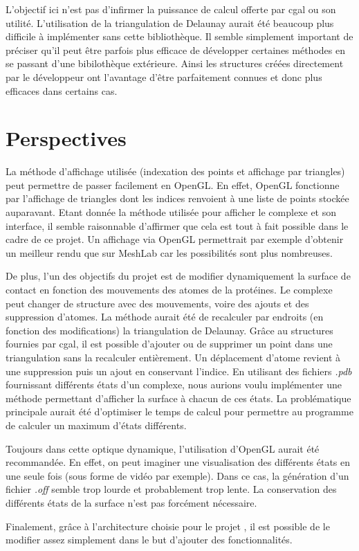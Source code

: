 L'objectif ici n'est pas d'infirmer la puissance de calcul offerte par \gls{cgal} ou son utilité.
L'utilisation de la triangulation de Delaunay aurait été beaucoup plus difficile
à implémenter sans cette bibliothèque. Il semble simplement important de préciser qu'il peut être
parfois plus efficace de développer certaines méthodes en se passant d'une bibilothèque extérieure.
Ainsi les structures créées directement par le développeur ont l'avantage d'être
parfaitement connues et donc plus efficaces dans certains cas.

\section{Perspectives}

La méthode d'affichage utilisée (indexation des points et affichage par triangles)
peut permettre de passer facilement en OpenGL. En effet, OpenGL fonctionne par l'affichage
de triangles dont les indices renvoient à une liste de points stockée auparavant.
Etant donnée la méthode utilisée pour afficher le complexe et son interface, il semble
raisonnable d'affirmer que cela est tout à fait possible dans le cadre de ce projet.
Un affichage via OpenGL permettrait par exemple d'obtenir un meilleur rendu que sur
MeshLab car les possibilités sont plus nombreuses.

De plus, l'un des objectifs du projet est de modifier dynamiquement la surface de contact
en fonction des mouvements des atomes de la protéines. Le complexe peut changer de structure
avec des mouvements, voire des ajouts et des suppression d'atomes. La méthode aurait été
de recalculer par endroits (en fonction des modifications) la triangulation de Delaunay.
Grâce au structures fournies par \gls{cgal}, il est possible d'ajouter ou de supprimer
un point dans une triangulation sans la recalculer entièrement. Un déplacement d'atome
revient à une suppression puis un ajout en conservant l'indice. En utilisant des fichiers \textit{.pdb}
fournissant différents états d'un complexe, nous aurions voulu implémenter une méthode
permettant d'afficher la surface à chacun de ces états. La problématique principale
aurait été d'optimiser le temps de calcul pour permettre au programme de calculer un maximum
d'états différents.

Toujours dans cette optique dynamique, l'utilisation d'OpenGL aurait été recommandée.
En effet, on peut imaginer une visualisation des différents états en une seule fois (sous
forme de vidéo par exemple). Dans ce cas, la génération d'un fichier \textit{.off}
semble trop lourde et probablement trop lente. La conservation des différents états de
la surface n'est pas forcément nécessaire.

Finalement, grâce à l'architecture choisie pour le projet , il est possible de le
modifier assez simplement dans le but d'ajouter des fonctionnalités.
